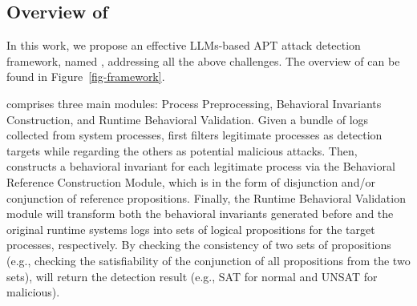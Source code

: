 
\subsection{Overview of \tool}
In this work, we propose an effective LLMs-based APT attack detection framework, named \tool, addressing all the above challenges. The overview of \tool can be found in Figure~\ref{fig-framework}.

\tool comprises three main modules: Process Preprocessing, Behavioral Invariants Construction, and Runtime Behavioral Validation. Given a bundle of logs collected from system processes, \tool first filters legitimate processes as detection targets while regarding the others as potential malicious attacks. Then, \tool constructs a behavioral invariant for each legitimate process via the Behavioral Reference Construction Module, which is in the form of disjunction and/or conjunction of reference propositions. Finally, the Runtime Behavioral Validation module will transform both the behavioral invariants generated before and the original runtime systems logs into sets of logical propositions for the target processes, respectively. By checking the consistency of two sets of propositions (e.g., checking the satisfiability of the conjunction of all propositions from the two sets), \tool will return the detection result (e.g., SAT for normal and UNSAT for malicious).
% 

